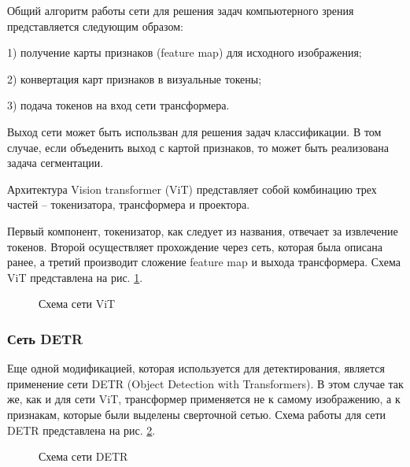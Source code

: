 \documentclass[14pt,a4paper]{extarticle}
\begin{document}
Общий алгоритм работы сети для решения задач компьютерного зрения представляется следующим образом:

1) получение карты признаков (feature map) для исходного изображения;

2) конвертация карт признаков в визуальные токены;

3) подача токенов на вход сети трансформера.

Выход сети может быть использван для решения задач классификации. В том случае, если объеденить выход с картой признаков, то может быть реализована задача сегментации. 

Архитектура Vision transformer (ViT) представляет собой комбинацию трех частей -- токенизатора, трансформера и проектора. 

Первый компонент, токенизатор, как следует из названия, отвечает за извлечение токенов. Второй осуществляет прохождение через сеть, которая была описана ранее, а третий производит сложение feature map и выхода трансформера. Схема ViT представлена на рис. \ref{vitr_lbl}.
\begin{figure}[h!]
\caption{Схема сети ViT}
\label{vitr_lbl}
\end{figure} 

\newpage
\subsubsection*{Сеть DETR}
Еще одной модификацией, которая используется для детектирования, является применение сети DETR (Object Detection with Transformers). В этом случае так же, как и для сети ViT, трансформер применяется не к самому изображению, а к признакам, которые были выделены сверточной сетью. Схема работы для сети DETR представлена на рис. \ref{detr_lbl}.
\begin{figure}[b!]
\caption{Схема сети DETR}
\label{detr_lbl}
\end{figure} 
\end{document}
